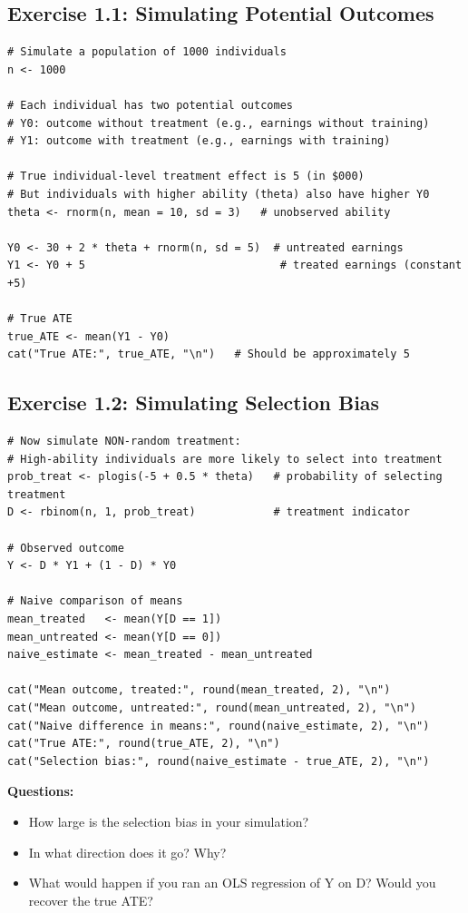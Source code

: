 \subsection{Exercise 1.1: Simulating Potential Outcomes}

\begin{lstlisting}
# Simulate a population of 1000 individuals
n <- 1000

# Each individual has two potential outcomes
# Y0: outcome without treatment (e.g., earnings without training)
# Y1: outcome with treatment (e.g., earnings with training)

# True individual-level treatment effect is 5 (in $000)
# But individuals with higher ability (theta) also have higher Y0
theta <- rnorm(n, mean = 10, sd = 3)   # unobserved ability

Y0 <- 30 + 2 * theta + rnorm(n, sd = 5)  # untreated earnings
Y1 <- Y0 + 5                              # treated earnings (constant +5)

# True ATE
true_ATE <- mean(Y1 - Y0)
cat("True ATE:", true_ATE, "\n")   # Should be approximately 5
\end{lstlisting}

\subsection{Exercise 1.2: Simulating Selection Bias}

\begin{lstlisting}
# Now simulate NON-random treatment:
# High-ability individuals are more likely to select into treatment
prob_treat <- plogis(-5 + 0.5 * theta)   # probability of selecting treatment
D <- rbinom(n, 1, prob_treat)            # treatment indicator

# Observed outcome
Y <- D * Y1 + (1 - D) * Y0

# Naive comparison of means
mean_treated   <- mean(Y[D == 1])
mean_untreated <- mean(Y[D == 0])
naive_estimate <- mean_treated - mean_untreated

cat("Mean outcome, treated:", round(mean_treated, 2), "\n")
cat("Mean outcome, untreated:", round(mean_untreated, 2), "\n")
cat("Naive difference in means:", round(naive_estimate, 2), "\n")
cat("True ATE:", round(true_ATE, 2), "\n")
cat("Selection bias:", round(naive_estimate - true_ATE, 2), "\n")
\end{lstlisting}

\textbf{Questions:}
\begin{itemize}
\item How large is the selection bias in your simulation?
\item In what direction does it go? Why?
\item What would happen if you ran an OLS regression of Y on D? Would you recover the true ATE?
\end{itemize}

